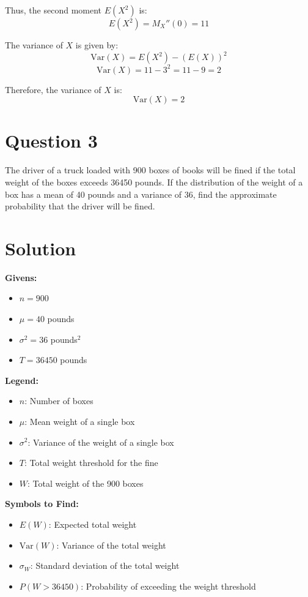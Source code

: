 \documentclass[12pt]{article}
\begin{document}
Thus, the second moment \( E(X^2) \) is:
\[ E(X^2) = M_X''(0) = 11 \]

The variance of \( X \) is given by:
\[ \text{Var}(X) = E(X^2) - (E(X))^2 \]
\[ \text{Var}(X) = 11 - 3^2 = 11 - 9 = 2 \]

Therefore, the variance of \( X \) is:
\[ \text{Var}(X) = 2 \]


\newpage
\section*{Question 3}
The driver of a truck loaded with 900 boxes of books will be fined if the total weight of the boxes exceeds 36450 pounds. If the distribution of the weight of a box has a mean of 40 pounds and a variance of 36, find the approximate probability that the driver will be fined.

\section*{Solution}
\begin{multicols}{2}
  \textbf{Givens:}
  \begin{itemize}
    \item \( n = 900 \)
    \item \( \mu = 40 \) pounds
    \item \( \sigma^2 = 36 \) pounds\(^2\)
    \item \( T = 36450 \) pounds
  \end{itemize}

  \columnbreak

  \textbf{Legend:}
  \begin{itemize}
    \item \( n \): Number of boxes
    \item \( \mu \): Mean weight of a single box
    \item \( \sigma^2 \): Variance of the weight of a single box
    \item \( T \): Total weight threshold for the fine
    \item \( W \): Total weight of the 900 boxes
  \end{itemize}

\end{multicols}

\textbf{Symbols to Find:}
\begin{itemize}
  \item \( E(W) \): Expected total weight
  \item \( \text{Var}(W) \): Variance of the total weight
  \item \( \sigma_W \): Standard deviation of the total weight
  \item \( P(W > 36450) \): Probability of exceeding the weight threshold
\end{itemize}
\end{document}
